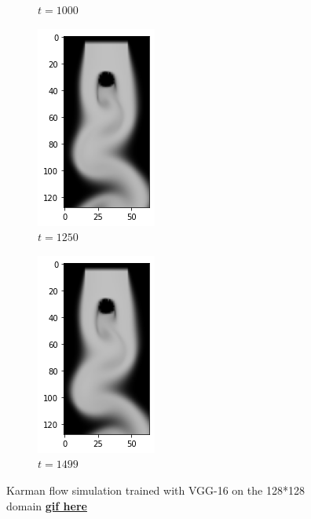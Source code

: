 \documentclass[a4paper,12pt,twoside]{report}
\begin{document}
\begin{figure}
\begin{subfigure}{0.18\textwidth}
		\caption{$t=1000$}
	\end{subfigure}
	\begin{subfigure}{0.18\textwidth}
		\centering
		\includegraphics[scale=0.5]{karmanflow/vgg_density_001250.png}
		\caption{$t=1250$}
	\end{subfigure}
	\begin{subfigure}{0.18\textwidth}
		\centering
		\includegraphics[scale=0.5]{karmanflow/vgg_density_001499.png}
		\caption{$t=1499$}
	\end{subfigure}
	\caption{Karman flow simulation trained with VGG-16 on the 128*128 domain \href{https://github.com/w191444052/sol-data/blob/master/karman_high/vgg.gif}{\bf{gif here}}}
	\label{sol karman high vgg}
\end{figure}
\end{document}

